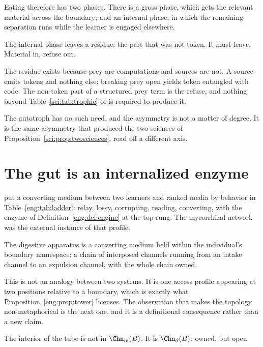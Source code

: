 Eating therefore has two phases. There is a gross phase, which gets the relevant
material across the boundary; and an internal phase, in which the remaining
separation runs while the learner is engaged elsewhere.

The internal phase leaves a residue: the part that was not token. It must leave.
Material in, refuse out.

\begin{observation}
\label{tub:obs:refuse}
The residue exists because prey are computations and sources are not. A source
emits tokens and nothing else; breaking prey open yields token entangled with
code. The non-token part of a structured prey term is the refuse, and nothing
beyond Table~\ref{sci:tab:trophic} of \chSci is required to produce it.
\end{observation}

The autotroph has no such need, and the asymmetry is not a matter of degree. It
is the same asymmetry that produced the two sciences of
Proposition~\ref{sci:prop:twosciences}, read off a different axis.

\section{The gut is an internalized enzyme}
\label{tub:sec:ident}

\chEng put a converting medium between two learners and ranked media by behavior
in Table~\ref{eng:tab:ladder}: relay, lossy, corrupting, reading, converting,
with the enzyme of Definition~\ref{eng:def:engine} at the top rung. The
mycorrhizal network was the external instance of that profile.

\begin{observation}
\label{tub:obs:gut}
The digestive apparatus is a converting medium held within the individual's
boundary namespace: a chain of interposed channels running from an intake
channel to an expulsion channel, with the whole chain owned.
\end{observation}

This is not an analogy between two systems. It is one access profile appearing
at two positions relative to a boundary, which is exactly what
Proposition~\ref{eng:prop:tower} licenses. The observation that makes the
topology non-metaphorical is the next one, and it is a definitional consequence
rather than a new claim.

\begin{observation}
\label{tub:obs:lumen}
The interior of the tube is not in $\Chn_{\mathrm{in}}(B)$. It is
$\Chn_{\partial}(B)$: owned, but open.
\end{observation}

